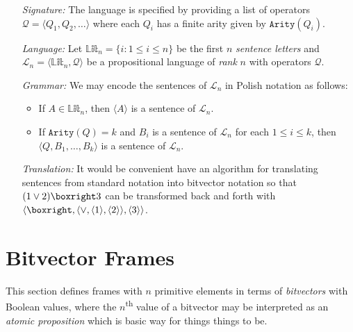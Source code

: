 \documentclass[a4paper, 11pt]{article} %
\newcommand{\tuple}[1]{\langle#1\rangle} %
\newcommand{\set}[1]{\lbrace#1\rbrace} %
\newcommand{\Lit}[0]{\mathbb{Lit}}
\newcommand{\arity}[1]{\texttt{Arity}(#1)}
\renewcommand{\L}[0]{\mathcal{L}}
\newcommand{\Q}[0]{\mathcal{Q}}
\begin{document}
\begin{enumerate}
  \item[\it Signature:] The language is specified by providing a list of operators $\Q=\tuple{Q_1,Q_2,\ldots}$ where each $Q_i$ has a finite arity given by $\arity{Q_i}$.
  \item[\it Language:] Let $\Lit_n=\set{i:1\leq i\leq n}$ be the first $n$ \textit{sentence letters} and $\L_n=\tuple{\Lit_n,\Q}$ be a propositional language of \textit{rank} $n$ with operators $\Q$.
  \item[\it Grammar:] We may encode the sentences of $\L_n$ in Polish notation as follows:
    \begin{itemize}
      \item If $A\in\Lit_n$, then $\tuple{A}$ is a sentence of $\L_n$.
      \item If $\arity{Q}=k$ and $B_i$ is a sentence of $\L_n$ for each $1\leq i\leq k$, then $\tuple{Q,B_1,\ldots,B_k}$ is a sentence of $\L_n$.
    \end{itemize}
  \item[\it Translation:] It would be convenient have an algorithm for translating sentences from standard notation into bitvector notation so that $( 1 \vee 2 ) \boxright 3$ can be transformed back and forth with $\tuple{\boxright, \tuple{\vee, \tuple{1}, \tuple{2}}, \tuple{3}}$.
\end{enumerate}

\section{Bitvector Frames}

This section defines frames with $n$ primitive elements in terms of \textit{bitvectors} with Boolean values, where the $n$\textsuperscript{th} value of a bitvector may be interpreted as an \textit{atomic proposition} which is basic way for things things to be.
\end{document}
